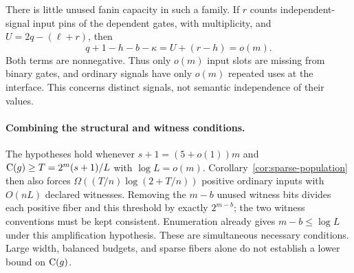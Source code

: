 There is little unused fanin capacity in such a family. If $r$ counts
independent-signal input pins of the dependent gates, with multiplicity,
and $U=2q-(\ell+r)$, then
\[
 q+1-h-b-\kappa=U+(r-h)=o(m).
\]
Both terms are nonnegative. Thus only $o(m)$ input slots are missing
from binary gates, and ordinary signals have only $o(m)$ repeated
uses at the interface. This concerns distinct signals, not semantic
independence of their values.

\paragraph{Combining the structural and witness conditions.}
The hypotheses hold whenever $s+1=(5+o(1))m$ and
$\mathrm{C}(g)\ge T=2^m(s+1)/L$ with $\log L=o(m)$.
Corollary~\ref{cor:sparse-population} then also forces
$\Omega((T/n)\log(2+T/n))$ positive ordinary inputs with $O(nL)$
declared witnesses. Removing the $m-b$ unused witness bits divides
each positive fiber and this threshold by exactly $2^{m-b}$;
the two witness conventions must be kept consistent.
Enumeration already gives $m-b\le\log L$ under this amplification
hypothesis. These are simultaneous necessary conditions. Large
width, balanced budgets, and sparse fibers alone do not establish
a lower bound on $\mathrm{C}(g)$.

